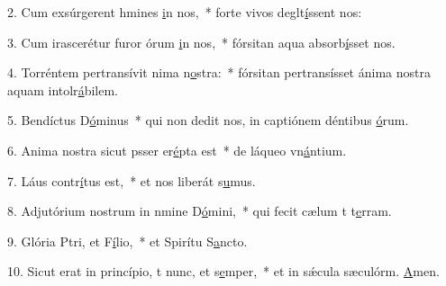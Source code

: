 2. Cum exsúrgerent hmines \uline{i}n nos,~* forte vivos deglt\uline{í}ssent nos:\par 
3. Cum irascerétur furor órum \uline{i}n nos,~* fórsitan aqua absorb\uline{í}sset nos.\par 
4. Torréntem pertransívit nima n\uline{o}stra:~* fórsitan pertransísset ánima nostra aquam intolr\uline{á}bilem.\par 
5. Bendíctus D\uline{ó}minus~* qui non dedit nos, in captiónem déntibus \uline{ó}rum.\par 
6. Anima nostra sicut psser er\uline{é}pta est~* de láqueo vn\uline{á}ntium.\par 
7. Láus contr\uline{í}tus est,~* et nos liberát s\uline{u}mus.\par 
8. Adjutórium nostrum in nmine D\uline{ó}mini,~* qui fecit cælum t t\uline{e}rram.\par 
9. Glória Ptri, et F\uline{í}lio,~* et Spirítu S\uline{a}ncto.\par 
10. Sicut erat in princípio, t nunc, et s\uline{e}mper,~* et in sǽcula sæculórm. \uline{A}men.\par 

